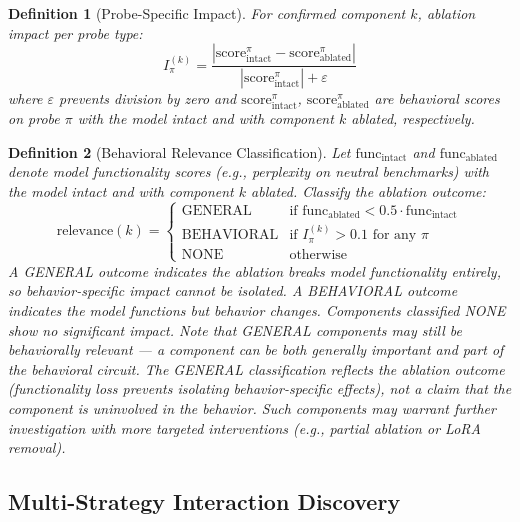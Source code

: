 \documentclass[11pt]{article}
\newtheorem{definition}{Definition}[section]
\begin{document}
\begin{definition}[Probe-Specific Impact]
\label{def:probe-specific-impact}
For confirmed component $k$, ablation impact per probe type:
\begin{equation}
I^{(k)}_\pi = \frac{\left|\text{score}^\pi_{\text{intact}} - \text{score}^\pi_{\text{ablated}}\right|}{|\text{score}^\pi_{\text{intact}}| + \varepsilon}
\end{equation}
where $\varepsilon$ prevents division by zero and $\text{score}^\pi_{\text{intact}}$, $\text{score}^\pi_{\text{ablated}}$ are behavioral scores on probe $\pi$ with the model intact and with component $k$ ablated, respectively.
\end{definition}

\begin{definition}[Behavioral Relevance Classification]
\label{def:behav-relevance-class}
Let $\text{func}_{\text{intact}}$ and $\text{func}_{\text{ablated}}$ denote model functionality scores (e.g., perplexity on neutral benchmarks) with the model intact and with component $k$ ablated. Classify the ablation outcome:
\begin{equation}
\text{relevance}(k) = \begin{cases}
\text{GENERAL} & \text{if } \text{func}_{\text{ablated}} < 0.5 \cdot \text{func}_{\text{intact}} \\
\text{BEHAVIORAL} & \text{if } I^{(k)}_\pi > 0.1 \text{ for any } \pi \\
\text{NONE} & \text{otherwise}
\end{cases}
\end{equation}
A GENERAL outcome indicates the ablation breaks model functionality entirely, so behavior-specific impact cannot be isolated. A BEHAVIORAL outcome indicates the model functions but behavior changes. Components classified NONE show no significant impact. Note that GENERAL components may still be behaviorally relevant --- a component can be both generally important and part of the behavioral circuit. The GENERAL classification reflects the ablation outcome (functionality loss prevents isolating behavior-specific effects), not a claim that the component is uninvolved in the behavior. Such components may warrant further investigation with more targeted interventions (e.g., partial ablation or LoRA removal).
\end{definition}

\subsection{Multi-Strategy Interaction Discovery}
\label{sec:multi-strategy-interaction-discovery}
\end{document}
